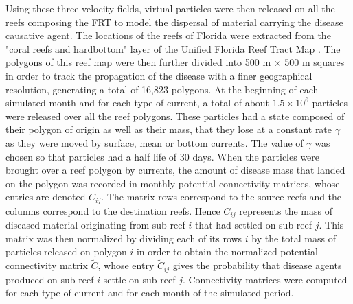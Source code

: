 \documentclass[utf8]{frontiersSCNS}
\begin{document}
Using these three velocity fields, virtual particles were then released on all the reefs composing the FRT to model the dispersal of material carrying the disease causative agent. The locations of the reefs of Florida were extracted from the "coral reefs and hardbottom" layer of the Unified Florida Reef Tract Map \citep{fwc2017unified}. The polygons of this reef map were then further divided into 500 m $\times$ 500 m squares in order to track the propagation of the disease with a finer geographical resolution, generating a total of 16,823 polygons. At the beginning of each simulated month and for each type of current, a total of about $1.5 \times 10^6$ particles were released over all the reef polygons. These particles had a state composed of their polygon of origin as well as their mass, that they lose at a constant rate $\gamma$ as they were moved by surface, mean or bottom currents. The value of $\gamma$ was chosen so that particles had a half life of 30 days. When the particles were brought over a reef polygon by currents, the amount of disease mass that landed on the polygon was recorded in monthly potential connectivity matrices, whose entries are denoted $C_{ij}$. The matrix rows correspond to the source reefs and the columns correspond to the destination reefs. Hence $C_{ij}$ represents the mass of diseased material originating from sub-reef $i$ that had settled on sub-reef $j$. This matrix was then normalized by dividing each of its rows $i$ by the total mass of particles released on polygon $i$ in order to obtain the normalized potential connectivity matrix $\tilde{C}$, whose entry $\tilde{C}_{ij}$ gives the probability that disease agents produced on sub-reef $i$ settle on sub-reef $j$. Connectivity matrices were computed for each type of current and for each month of the simulated period.
\end{document}
